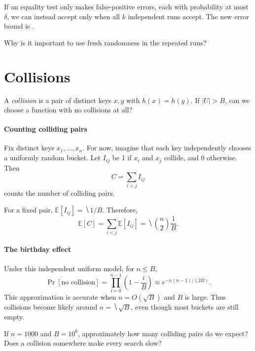 \documentclass[11pt]{article}
\begin{document}
If an equality test only makes false-positive errors, each with probability
at most $\delta$, we can instead accept only when all $k$ independent runs
accept. The new error bound is .

\vfill
Why is it important to use fresh randomness in the repeated runs?
\vs{.7cm}

\newpage
\section{Collisions}
A \emph{collision} is a pair of distinct keys $x,y$ with $h(x)=h(y)$.
If $|U|>B$, can we choose a function with no collisions at all?
\vs{.7cm}

\paragraph{Counting colliding pairs}
Fix distinct keys $x_1,\ldots,x_n$. For now, imagine that each key independently
chooses a uniformly random bucket. Let $I_{ij}$ be 1 if $x_i$ and $x_j$ collide,
and 0 otherwise. Then
\begin{equation*}
    C=\sum_{i<j}I_{ij}
\end{equation*}
counts the number of colliding pairs.

For a fixed pair, $\mathbb E[I_{ij}]=\hide{1/B}$. Therefore,
\begin{equation*}
    \mathbb E[C]=\sum_{i<j}\mathbb E[I_{ij}]
        =\hide{\binom n2\frac1B}.
\end{equation*}

\paragraph{The birthday effect}
Under this independent uniform model, for $n\leq B$,
\begin{equation*}
    \Pr[\text{no collision}]
      =\prod_{i=0}^{n-1}\left(1-\frac{i}{B}\right)
      \approx e^{-n(n-1)/(2B)}.
\end{equation*}
This approximation is accurate when $n=O(\sqrt B)$ and $B$ is large.
Thus collisions become likely around $n=\hide{\sqrt B}$, even though
most buckets are still empty.

\begin{Qu}
    If $n=1000$ and $B=10^6$, approximately how many colliding pairs do we
    expect? Does a collision somewhere make every search slow?
\end{Qu}
\vs{1cm}
\end{document}
